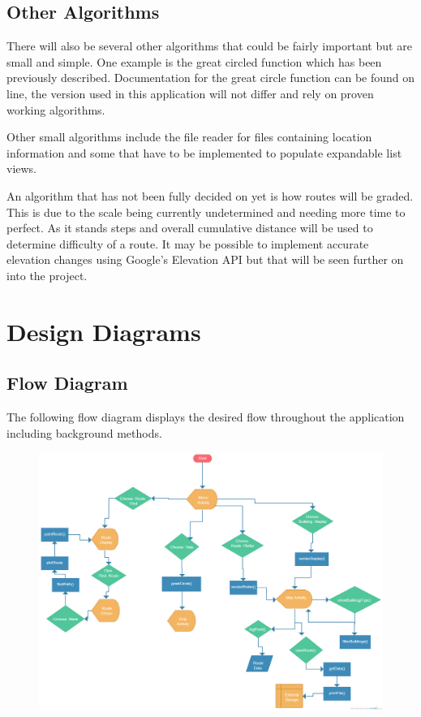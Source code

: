 \documentclass[10pt,a4paper]{article}
\begin{document}
\subsection{Other Algorithms}
There will also be several other algorithms that could be fairly important but are small and simple. One example is the great circled function which has been previously described. Documentation for the great circle function can be found on line, the version used in this application will not differ and rely on proven working algorithms. 

Other small algorithms include the file reader for files containing location information and some that have to be implemented to populate expandable list views.

An algorithm that has not been fully decided on yet is how routes will be graded. This is due to the scale being currently undetermined and needing more time to perfect. As it stands steps and overall cumulative distance will be used to determine difficulty of a route. It may be possible to implement accurate elevation changes using Google's Elevation API but that will be seen further on into the project. 
\section{Design Diagrams}
\subsection{Flow Diagram}
The following flow diagram displays the desired flow throughout the application including background methods.

\newpage
{}


\begin{figure}
\includegraphics[scale=0.27]{Flow.png}
\end{figure}
\end{document}
